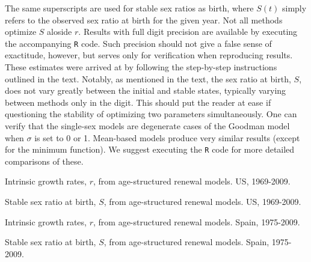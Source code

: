 The same superscripts are used for stable sex ratios as birth, where $S(t)$
simply refers to the observed sex ratio at birth for the given year. Not
all methods optimize $S$ aloside $r$. Results with full digit precision are
available by executing the accompanying \texttt{R} code. Such precision 
should not give a false sense of exactitude, however, but
serves only for verification when reproducing results. These estimates were
arrived at by following the step-by-step instructions outlined in the text.
Notably, as mentioned in the text, the sex ratio at birth, $S$, does not vary
greatly between the initial and stable states, typically varying between
methods only in the  digit. This should put the reader at ease if
questioning the stability of optimizing two parameters simultaneously. One can
verify that the single-sex models are degenerate cases of the Goodman model when
$\sigma$ is set to 0 or 1. Mean-based models produce very similar results
(except for the minimum function). We suggest executing the \texttt{R} code for
more detailed comparisons of these.


\begin{table}
  \begin{adjustwidth}{-1in}{-.5in}
  \centering
    \caption{Intrinsic growth rates, $r$, from age-structured renewal models.
    US, 1969-2009.}
    \label{tab:USageALL}
        \scriptsize{}
  \end{adjustwidth}
\end{table}


\begin{table}
  \begin{adjustwidth}{-1in}{-.5in}
  \centering
    \caption{Stable sex ratio at birth, $S$, from age-structured renewal
    models. US, 1969-2009.}
    \label{tab:USageSRBALL}
        \footnotesize{}
  \end{adjustwidth}
\end{table}

\begin{table}
  \begin{adjustwidth}{-1in}{-.5in}
  \centering
    \caption{Intrinsic growth rates, $r$, from age-structured renewal models.
    Spain, 1975-2009.}
    \label{tab:ESageALL}
        \scriptsize{}
  \end{adjustwidth}
\end{table}

\begin{table}
  \begin{adjustwidth}{-1in}{-.5in}
  \centering
    \caption{Stable sex ratio at birth, $S$, from age-structured renewal
    models. Spain, 1975-2009.}
    \label{tab:ESageSRBALL}
        \footnotesize{}
  \end{adjustwidth}
\end{table}


\FloatBarrier